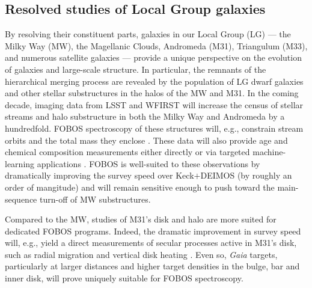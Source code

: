 
\subsection{Resolved studies of Local Group galaxies}
\label{sec:localgroup}

By resolving their constituent parts, galaxies in our Local Group
(LG) --- the Milky Way (MW), the Magellanic Clouds, Andromeda (M31),
Triangulum (M33), and numerous satellite galaxies
--- provide a unique perspective on the evolution of galaxies and
large-scale structure. In particular, the remnants of the
hierarchical merging process are revealed by the population of LG
dwarf galaxies and other stellar substructures in the halos of the MW
and M31. In the coming decade, imaging data from LSST and WFIRST will
increase the census of stellar streams and halo substructure in both
the Milky Way and Andromeda by a hundredfold. FOBOS spectroscopy of
these structures will, e.g., constrain stream orbits and the total
mass they enclose \citep{2017ApJ...836..234S}. These data will also
provide age and chemical composition measurements either directly or
via targeted machine-learning applications \citep[see Section
\ref{sec:datascience};][]{2015ApJ...808...16N, 2018arXiv180401530T,
2018arXiv180803278T}. FOBOS is well-suited to these observations by
dramatically improving the survey speed over Keck$+$DEIMOS (by
roughly an order of mangitude) and will remain sensitive enough to
push toward the main-sequence turn-off of MW substructures.

Compared to the MW, studies of M31's disk and halo are more suited
for dedicated FOBOS programs. Indeed, the dramatic improvement in
survey speed will, e.g., yield a direct measurements of secular
processes active in M31's disk, such as radial migration and vertical
disk heating \citep{2013ApJ...779..103D, 2015ApJ...803...24D,
2019ApJ...871...11Q}. Even so, {\it Gaia} targets, particularly at
larger distances and higher target densities in the bulge, bar and
inner disk, will prove uniquely suitable for FOBOS spectroscopy.



